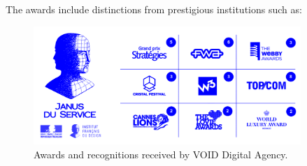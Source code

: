\noindent
The awards include distinctions from prestigious institutions such as:
\begin{figure}[ht]
        \centering
        \includegraphics[width=0.9\textwidth]{images/awards-void.png}
        \caption{Awards and recognitions received by VOID Digital Agency.}
        \label{fig:void-awards}
    \end{figure}

